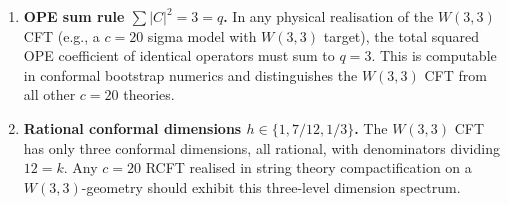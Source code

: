 \begin{enumerate}[label=\textbf{P\arabic*.},start=29]
  \item \textbf{OPE sum rule $\sum|C|^2=3=q$.}
        In any physical realisation of the $W(3,3)$ CFT
        (e.g., a $c=20$ sigma model with $W(3,3)$ target),
        the total squared OPE coefficient of identical
        operators must sum to $q=3$.  This is computable
        in conformal bootstrap numerics and distinguishes
        the $W(3,3)$ CFT from all other $c=20$ theories.
  \item \textbf{Rational conformal dimensions $h\in\{1,7/12,1/3\}$.}
        The $W(3,3)$ CFT has only three conformal dimensions,
        all rational, with denominators dividing $12=k$.
        Any $c=20$ RCFT realised in string theory compactification
        on a $W(3,3)$-geometry should exhibit this
        three-level dimension spectrum.
\end{enumerate}
